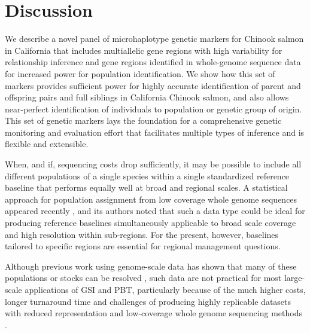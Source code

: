 \section*{Discussion}

We describe a novel panel of microhaplotype genetic markers for Chinook salmon
in California that includes multiallelic gene regions with high variability for
relationship inference and gene regions identified in whole-genome sequence data
for increased power for population identification. We show how this set of markers
provides sufficient power for highly accurate identification of parent and offspring
pairs and full siblings in California Chinook salmon, and also allows near-perfect
identification of individuals to population or genetic group of origin. This set of
genetic markers lays the foundation for a comprehensive genetic monitoring and evaluation effort
that facilitates multiple types of inference and is flexible and extensible.


When, and if, sequencing costs drop sufficiently, it may be possible to include
all different populations of a single species within a single standardized reference baseline
that performs equally well at broad and regional scales. A statistical approach for population
assignment from low coverage whole genome sequences appeared recently
\citep{desaixINPRESSpopulation}, and its authors noted that such a data type could
be ideal for producing reference baselines simultaneously applicable to broad scale
coverage and high resolution within sub-regions.   For the present, however,
baselines tailored to specific regions are essential for regional management questions.

Although previous work using genome-scale data has shown that many of
these populations or stocks can be resolved \cite{thompson2020complex,meek2020identifying},
such data are not practical for most large-scale applications of GSI and PBT, particularly because
of the much higher costs, longer turnaround time and challenges of producing highly
replicable datasets with reduced representation and low-coverage whole genome sequencing methods \cite{ali2016rad}.

